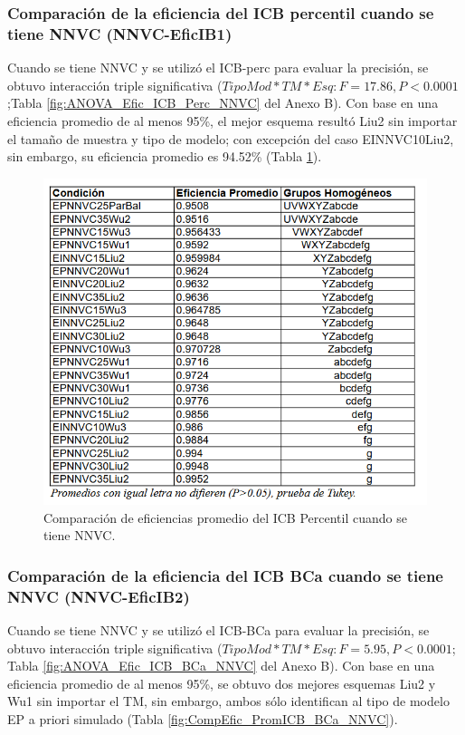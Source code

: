 
\subsubsection{Comparación de la eficiencia del ICB percentil cuando se tiene NNVC (NNVC-EficIB1)}

Cuando se tiene NNVC y se utilizó el ICB-perc para evaluar la precisión, se obtuvo interacción triple significativa ($TipoMod*TM*Esq: F=17.86, P<0.0001$;Tabla \ref{fig:ANOVA_Efic_ICB_Perc_NNVC} del Anexo B). Con base en una eficiencia promedio de al menos 95\%, el mejor esquema resultó Liu2 sin importar el tamaño de muestra y tipo de modelo; con excepción del caso EINNVC10Liu2, sin embargo, su eficiencia promedio es 94.52\% (Tabla \ref{fig:CompEfic_PromICB_Perc_NNVC}).\\

\begin{figure}[ht] 
	\centering 
	\includegraphics[width=0.76\linewidth]{img/CompEfic_PromICB_Perc_NNVC.png} 
	\caption{Comparación de eficiencias promedio del ICB Percentil cuando se tiene NNVC.} 
	\label{fig:CompEfic_PromICB_Perc_NNVC}
\end{figure}
\FloatBarrier



\subsubsection{Comparación de la eficiencia del ICB BCa cuando se tiene NNVC (NNVC-EficIB2)}

Cuando se tiene NNVC y se utilizó el ICB-BCa para evaluar la precisión, se obtuvo interacción triple significativa ($TipoMod*TM*Esq: F=5.95, P<0.0001$; Tabla \ref{fig:ANOVA_Efic_ICB_BCa_NNVC} del Anexo B). Con base en una eficiencia promedio de al menos 95\%, se obtuvo dos mejores esquemas Liu2 y Wu1 sin importar el TM, sin embargo, ambos sólo identifican al tipo de modelo EP a priori simulado (Tabla \ref{fig:CompEfic_PromICB_BCa_NNVC}). \\



